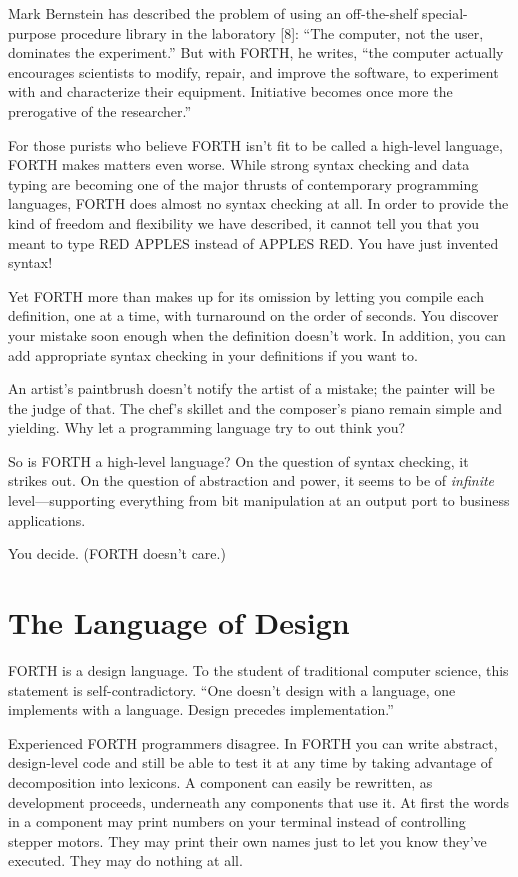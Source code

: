 Mark Bernstein has described the problem of using an off-the-shelf
special-purpose procedure library in the laboratory {[}8{]}: {}``The
computer, not the user, dominates the experiment.'' But with FORTH,
he writes, {}``the computer actually encourages scientists to modify,
repair, and improve the software, to experiment with and characterize
their equipment. Initiative becomes once more the prerogative of the
researcher.''


For those purists who believe FORTH isn't fit to be called a high-level
language, FORTH makes matters even worse. While strong syntax checking
and data typing are becoming one of the major thrusts of contemporary
programming languages, FORTH does almost no syntax checking at all.
In order to provide the kind of freedom and flexibility we have described,
it cannot tell you that you meant to type RED APPLES instead of APPLES
RED. You have just invented syntax!

Yet FORTH more than makes up for its omission by letting you compile
each definition, one at a time, with turnaround on the order of seconds.
You discover your mistake soon enough when the definition doesn't
work. In addition, you can add appropriate syntax checking in your
definitions if you want to.

An artist's paintbrush doesn't notify the artist of a mistake; the
painter will be the judge of that. The chef's skillet and the composer's
piano remain simple and yielding. Why let a programming language try
to out think you?

So is FORTH a high-level language? On the question of syntax checking,
it strikes out. On the question of abstraction and power, it seems
to be of \emph{infinite} level---supporting everything from bit manipulation
at an output port to business applications.

You decide. (FORTH doesn't care.)


\section{The Language of Design}

FORTH is a design language. To the student of traditional computer
science, this statement is self-contradictory. {}``One doesn't design
with a language, one implements with a language. Design precedes implementation.''

Experienced FORTH programmers disagree. In FORTH you can write abstract,
design-level code and still be able to test it at any time by taking
advantage of decomposition into lexicons. A component can easily be
rewritten, as development proceeds, underneath any components that
use it. At first the words in a component may print numbers on your
terminal instead of controlling stepper motors. They may print their
own names just to let you know they've executed. They may do nothing
at all.

